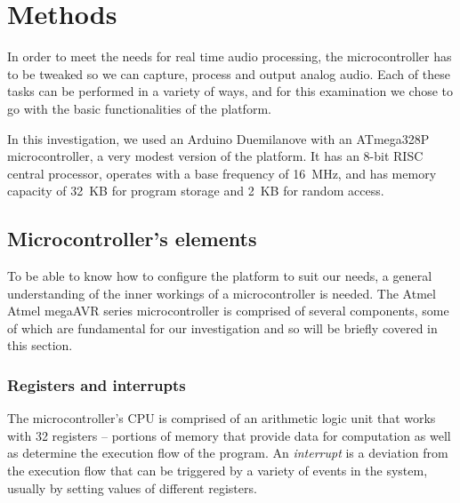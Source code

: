 
\section{Methods}
\label{sec:methods}

In order to meet the needs for real time audio processing, the microcontroller
has to be tweaked so we can capture, process and output analog audio. Each of
these tasks can be performed in a variety of ways, and for this examination we
chose to go with the basic functionalities of the platform.

In this investigation, we used an Arduino Duemilanove with an ATmega328P
microcontroller, a very modest version of the platform. It has an 8-bit RISC
central processor, operates with a base frequency of 16~MHz, and has memory
capacity of 32~KB for program storage and 2~KB for random access.

\subsection{Microcontroller's elements}

\setlength{\itemsep}{0em}

To be able to know how to configure the platform to suit our needs, a general
understanding of the inner workings of a microcontroller is needed. The Atmel
Atmel megaAVR series microcontroller is comprised of several components, some
of which are fundamental for our investigation and so will be briefly covered
in this section.

\subsubsection{Registers and interrupts}

The microcontroller's CPU is comprised of an arithmetic logic unit that works
with 32 registers -- portions of memory that provide data for computation as
well as determine the execution flow of the program. An \emph{interrupt} is a
deviation from the execution flow that can be triggered by a variety of events
in the system, usually by setting values of different registers.

